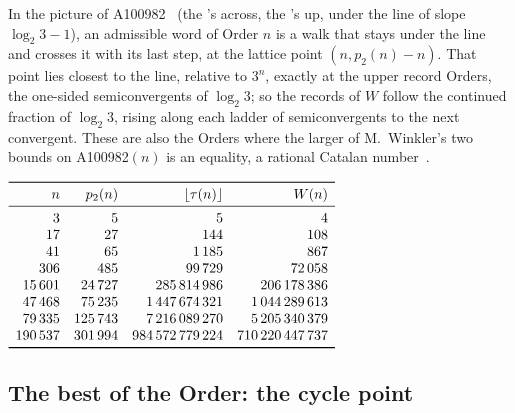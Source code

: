 \documentclass[10pt,a4paper,titlepage]{article}
\begin{document}
In the picture of A100982~\cite{OEIS_A100982} (the 's across, the
's up, under the line of slope $\log_2 3 - 1$), an admissible word of Order $n$ is a walk
that stays under the line and crosses it with its last step, at the lattice point
$(n, p_2(n) - n)$. That point lies closest to the line, relative to $3^n$, exactly at the upper
record Orders, the one-sided semiconvergents of $\log_2 3$; so the records of $W$ follow the
continued fraction of $\log_2 3$, rising along each ladder of semiconvergents to the next
convergent. These are also the Orders where the larger of M.~Winkler's two bounds on
A100982$(n)$ is an equality, a rational Catalan number~\cite{Winkler2026b}.

\begin{table}[htbp]
\centering
$\begin{array}{r r r r}
\toprule
n & p_2(n) & \lfloor \tau(n) \rfloor & W(n) \\
\midrule
3 & 5 & 5 & 4 \\
17 & 27 & 144 & 108 \\
41 & 65 & 1\,185 & 867 \\
306 & 485 & 99\,729 & 72\,058 \\
15\,601 & 24\,727 & 285\,814\,986 & 206\,178\,386 \\
47\,468 & 75\,235 & 1\,447\,674\,321 & 1\,044\,289\,613 \\
79\,335 & 125\,743 & 7\,216\,089\,270 & 5\,205\,340\,379 \\
190\,537 & 301\,994 & 984\,572\,779\,224 & 710\,220\,447\,737 \\
\bottomrule
\end{array}$
\caption{The bound of paper~2 and the bound with the largest $\rho$, at some upper record
Orders (computed exactly).}
\label{tab:rhomax}
\end{table}

\subsection*{The best of the Order: the cycle point}
\end{document}
